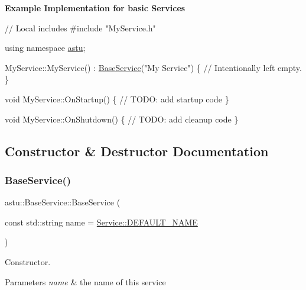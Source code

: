 {\bfseries Example Implementation for basic Services} 
\begin{DoxyCodeInclude}
\textcolor{comment}{// Local includes}
\textcolor{preprocessor}{#include "MyService.h"}

\textcolor{keyword}{using namespace }\hyperlink{namespaceastu}{astu};

MyService::MyService()
    : \hyperlink{classastu_1_1BaseService}{BaseService}(\textcolor{stringliteral}{"My Service"})
\{
    \textcolor{comment}{// Intentionally left empty.    }
\}

\textcolor{keywordtype}{void} MyService::OnStartup()
\{
    \textcolor{comment}{// TODO: add startup code}
\}

\textcolor{keywordtype}{void} MyService::OnShutdown()
\{
    \textcolor{comment}{// TODO: add cleanup code    }
\}
\end{DoxyCodeInclude}
 

\subsection{Constructor \& Destructor Documentation}
\mbox{\label{classastu_1_1BaseService_a8e95fc9bc1571dcbc9fb25237f968808}} 
\subsubsection{\texorpdfstring{Base\+Service()}{BaseService()}}
{\footnotesize\ttfamily astu\+::\+Base\+Service\+::\+Base\+Service (\begin{DoxyParamCaption}\item[{const std\+::string}]{name = {\ttfamily \hyperlink{classastu_1_1Service_a8bb66bb984aa9490026232b193896634}{Service\+::\+D\+E\+F\+A\+U\+L\+T\+\_\+\+N\+A\+ME}} }\end{DoxyParamCaption})\hspace{0.3cm}{\ttfamily [inline]}}

Constructor.


\begin{DoxyParams}{Parameters}
{\em name} & the name of this service \\
\hline
\end{DoxyParams}
\mbox{\label{classastu_1_1BaseService_ac4c335f1449a633e569a516560b18ef8}} 
